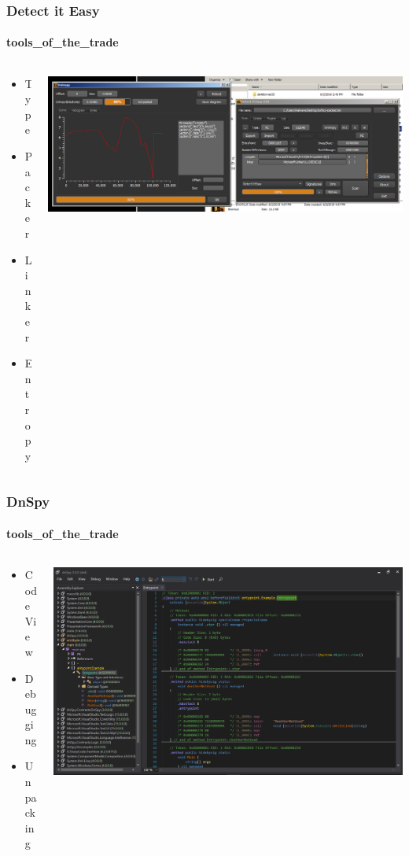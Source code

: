 \documentclass[aspectratio=169]{beamer}
\begin{document}
\begin{frame}
  \frametitle{Detect it Easy}
  \framesubtitle{tools\_of\_the\_trade}
  \begin{columns}
    \begin{column}{.2\textwidth}
      \begin{itemize}
      \item{Type}
      \item{Packer}
      \item{Linker}
      \item{Entropy}
      \end{itemize}
    \end{column}
    \hfill
    \begin{column}{.8\textwidth}
      \includegraphics[scale=.98]{detect-it-easy}
    \end{column}
  \end{columns}
\end{frame}

\begin{frame}
  \frametitle{DnSpy}
  \framesubtitle{tools\_of\_the\_trade}
  \begin{columns}
    \begin{column}{.3\textwidth}
      \begin{itemize}
        \item{Code View}
        \item{Debugging}
        \item{Unpacking}
      \end{itemize}
    \end{column}
    \hfill
    \begin{column}{.7\textwidth}
      \includegraphics[scale=0.22]{dnspy}
    \end{column}
  \end{columns}
\end{frame}
\end{document}

